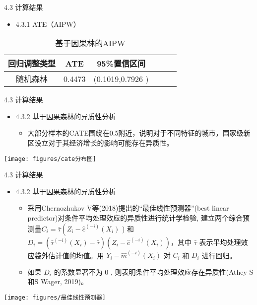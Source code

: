 \documentclass{beamer}%
\begin{document}
\begin{frame}[t]{\large 4.3 计算结果}
\begin{itemize}
  \item 4.3.1 ATE（AIPW）
\end{itemize}
\begin{table}
\centering
\caption{基于因果林的AIPW}
\begin{tabular}{cccccc}
   \toprule
   回归调整类型 & ATE & 95\%置信区间 \\
   \midrule
   随机森林 & 0.4473 & (0.1019,0.7926 )  \\
   \bottomrule
\end{tabular}
\end{table}
\end{frame}


\begin{frame}[t]{\large 4.3 计算结果}
\begin{itemize}
  \item 4.3.2 基于因果森林的异质性分析
  \begin{itemize}
  \item 大部分样本的CATE围绕在0.5附近，说明对于不同特征的城市，国家级新区设立对于其经济增长的影响可能存在异质性。
  \end{itemize}
\end{itemize}
\vspace{-0.4cm} %
\begin{center}
	\texttt{[image: figures/cate分布图]}
\end{center}
\end{frame}



\begin{frame}[t]{\large 4.3 计算结果}
\begin{itemize}
  \item 4.3.2 基于因果森林的异质性分析
  \begin{itemize}
  \item 采用Chernozhukov V等(2018)提出的“最佳线性预测器”(best linear predictor)对条件平均处理效应的异质性进行统计学检验, 建立两个综合预测量$C_i=\bar{\tau}\left(Z_i-\hat{e}^{(-i)}\left(X_i\right)\right.$ ) 和 $D_i=\left(\bar{\tau}^{(-i)}\left(X_i\right)-\bar{\tau}\right)\left(Z_i-\hat{e}^{(-i)}\left(X_i\right)\right)$，其中 $\bar{\tau}$ 表示平均处理效应袋外估计值的均值。用 $Y_i-\hat{m}^{(-i)}\left(X_i\right)$ 对 $C_i$ 和 $D_i$ 进行回归。
  \item 如果 $D_i$ 的系数显著不为 0 , 则表明条件平均处理效应存在异质性(Athey S和S Wager, 2019)。
  \end{itemize}
\end{itemize}
\begin{center}
		\texttt{[image: figures/最佳线性预测器]}
\end{center}
\end{frame}
\end{document}
